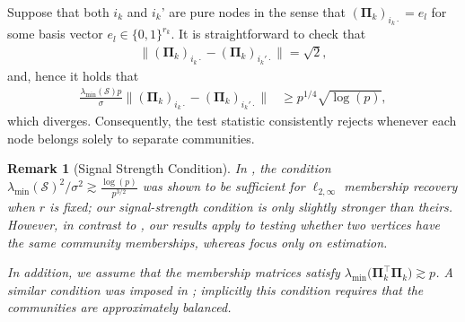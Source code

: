 \documentclass[10pt]{article}
\newcommand{\0}{{\mathbf{0}}}
\newcommand{\1}{{\mathbf{1}}}
\renewcommand{\citet}{\cite}
\renewcommand{\t}{^{\top}}
\newtheorem{remark}{Remark}
\renewcommand{\tilde}{\widetilde}
\begin{document}
Suppose that both $i_k$ and $i_k$' are pure nodes in the sense that $(\mathbf{\Pi}_k)_{i_k\cdot} = e_l$ for some basis vector $e_l \in \{0,1\}^{r_k}$.  It is straightforward to check that
\begin{align*}
    \| (\mathbf{\Pi}_k)_{i_k\cdot} - (\mathbf{\Pi}_k)_{i_k'\cdot} \| = \sqrt{2},
\end{align*}
and, hence it holds that
\begin{align*}
    \frac{\lambda_{\min}(\mathcal{S}) p}{\sigma}  \| (\mathbf{\Pi}_k)_{i_k\cdot} - (\mathbf{\Pi}_k)_{i_k'\cdot} \| &\geq  p^{1/4}\sqrt{\log(p)},
\end{align*}
which diverges.  Consequently, the test statistic consistently rejects whenever each node belongs solely to separate communities. 


\begin{remark}[Signal Strength Condition]
In \citet{agterberg_estimating_2022}, the condition $\lambda_{\min}(\mathcal{S})^2/\sigma^2 \gtrsim \frac{\log(p)}{p^{3/2}}$ was shown to be sufficient for $\ell_{2,\infty}$ membership recovery when $r$ is fixed; our signal-strength condition is only slightly stronger than theirs.  %
However, in contrast to \citet{agterberg_estimating_2022}, %
our results apply to testing whether two vertices have the same community memberships,  whereas \citet{agterberg_estimating_2022} focus only on estimation.

In addition, we assume that the membership matrices satisfy $\lambda_{\min}\big( \mathbf{\Pi}_k\t \mathbf{\Pi}_k \big) \gtrsim p$. A similar condition was imposed in \citet{agterberg_estimating_2022}; implicitly this condition requires that the communities are approximately balanced. 
\end{remark}
\end{document}
